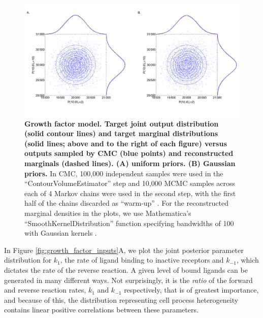\begin{figure}[H]
	\centerline{\includegraphics[width=\textwidth]{../figures/growth_factor_outputs.pdf}}
	\caption{\textbf{Growth factor model. Target joint output distribution (solid contour lines) and target marginal distributions (solid lines; above and to the right of each figure) versus outputs sampled by CMC (blue points) and reconstructed marginals (dashed lines). (A) uniform priors. (B) Gaussian priors.} In CMC, 100,000 independent samples were used in the ``ContourVolumeEstimator'' step and 10,000 MCMC samples across each of 4 Markov chains were used in the second step, with the first half of the chains discarded as ``warm-up'' \cite{lambert2018Student}. For the reconstructed marginal densities in the plots, we use Mathematica's ``SmoothKernelDistribution'' function specifying bandwidths of 100 with Gaussian kernels \cite{mathematica}.}
	\label{fig:growth_factor_outputs}
\end{figure}


In Figure \ref{fig:growth_factor_inputs}A, we plot the joint posterior parameter distribution for $k_1$, the rate of ligand binding to inactive receptors and $k_{-1}$, which dictates the rate of the reverse reaction.
A given level of bound ligands can be generated in many different ways. Not surprisingly, it is the \emph{ratio} of the forward and reverse reaction rates, $k_1$ and $k_{-1}$ respectively, that is of greatest importance, and because of this, the distribution representing cell process heterogeneity contains linear positive correlations between these parameters.



